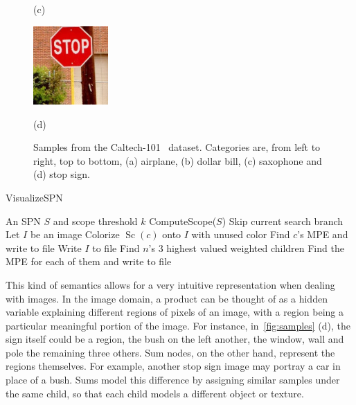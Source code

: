 \documentclass{article}
\DeclareMathOperator*{\Ch}{\text{Ch}}
\DeclareMathOperator*{\Sc}{\text{Sc}}
\begin{document}
\begin{figure}[t]
\begin{minipage}[t]{.48\linewidth}
    \centerline{(c)}\medskip
  \end{minipage}
  \begin{minipage}[t]{.48\linewidth}
    \centering\centerline{\includegraphics[height=3cm]{imgs/stop_sample.png}}
    \centerline{(d)}\medskip
  \end{minipage}
  \caption{Samples from the Caltech-101~\cite{fei04} dataset. Categories are, from left to right,
    top to bottom, (a) airplane, (b) dollar bill, (c) saxophone and (d) stop
    sign.\label{fig:samples}}
\end{figure}

\begin{algorithm}[!b]
  \caption{VisualizeSPN\label{alg:visualize}}
  \begin{algorithmic}[1]
    \Require An SPN $S$ and scope threshold $k$
    \State ComputeScope($S$)
      \If{$\Sc(n) < k$}
        \State Skip current search branch
      \EndIf%
        \State Let $I$ be an image
        \For{each node $c\in\Ch(n)$}
          \State Colorize $\Sc(c)$ onto $I$ with unused color
            \If{$c$ is sum \textbf{and} $|\Sc(c)|>k$}
              \State Find $c$'s MPE and write to file
            \EndIf%
          \EndIf%
        \EndFor%
        \State Write $I$ to file
        \State Find $n$'s 3 highest valued weighted children
        \State Find the MPE for each of them and write to file
      \EndIf%
    \EndFor%
  \end{algorithmic}
\end{algorithm}


This kind of semantics allows for a very intuitive representation when dealing with images. In the
image domain, a product can be thought of as a hidden variable explaining different regions of
pixels of an image, with a region being a particular meaningful portion of the image.  For
instance, in~\autoref{fig:samples} (d), the sign itself could be a region, the bush on the left
another, the window, wall and pole the remaining three others. Sum nodes, on the other hand,
represent the regions themselves. For example, another stop sign image may portray a car in place
of a bush.  Sums model this difference by assigning similar samples under the same child, so that
each child models a different object or texture.
\end{document}
